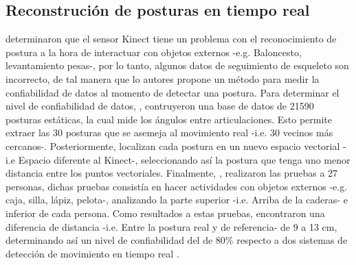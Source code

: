\subsection{Reconstruci\'on de posturas en tiempo real} \label{tr:2}
 determinaron que el sensor Kinect tiene un problema con el reconocimiento de postura a la hora de interactuar con objetos externos -e.g. Baloncesto, levantamiento pesas-, por lo tanto, algunos datos de seguimiento de esqueleto son incorrecto, de tal manera que lo autores propone un m\'etodo para medir la confiabilidad de datos al momento de detectar una postura.
\medbreak
Para determinar el nivel de confiabilidad de datos, , contruyeron una base de datos de 21590 posturas est\'aticas, la cual mide los \'angulos entre articulaciones. Esto permite  extraer las 30 posturas que se asemeja al movimiento real -i.e. 30 vecinos m\'as cercanos-.  Posteriormente, localizan cada postura en un nuevo espacio vectorial -i.e Espacio diferente al Kinect-, seleccionando as\'i la postura que tenga uno menor distancia entre los puntos vectoriales.
\medbreak
Finalmente, , realizaron las pruebas a 27 personas, dichas pruebas consist\'ia en hacer actividades con objetos externos -e.g. caja, silla, l\'apiz, pelota-, analizando la parte superior -i.e. Arriba de la caderas- e inferior de cada persona. Como resultados a estas pruebas, encontraron una diferencia de distancia -i.e. Entre la postura real y de referencia- de 9 a 13 cm, determinando as\'i un nivel de confiabilidad del de 80\% respecto a dos sistemas de detecci\'on de movimiento en tiempo real \cite{shum2011fast,shum2012real}.
